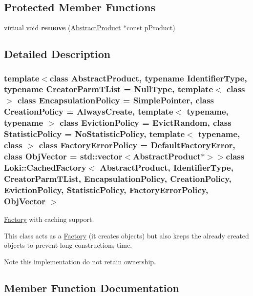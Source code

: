 \subsection*{Protected Member Functions}
\begin{DoxyCompactItemize}
\item 
\hypertarget{classLoki_1_1CachedFactory_a602f1ca3f2f2015f26386da61254ab6f}{}virtual void {\bfseries remove} (\hyperlink{classAbstractProduct}{Abstract\+Product} $\ast$const p\+Product)\label{classLoki_1_1CachedFactory_a602f1ca3f2f2015f26386da61254ab6f}

\end{DoxyCompactItemize}


\subsection{Detailed Description}
\subsubsection*{template$<$class Abstract\+Product, typename Identifier\+Type, typename Creator\+Parm\+T\+List = Null\+Type, template$<$ class $>$ class Encapsulation\+Policy = Simple\+Pointer, class Creation\+Policy = Always\+Create, template$<$ typename, typename $>$ class Eviction\+Policy = Evict\+Random, class Statistic\+Policy = No\+Statistic\+Policy, template$<$ typename, class $>$ class Factory\+Error\+Policy = Default\+Factory\+Error, class Obj\+Vector = std\+::vector$<$\+Abstract\+Product$\ast$$>$$>$class Loki\+::\+Cached\+Factory$<$ Abstract\+Product, Identifier\+Type, Creator\+Parm\+T\+List, Encapsulation\+Policy, Creation\+Policy, Eviction\+Policy, Statistic\+Policy, Factory\+Error\+Policy, Obj\+Vector $>$}

\hyperlink{classLoki_1_1Factory}{Factory} with caching support. 

This class acts as a \hyperlink{classLoki_1_1Factory}{Factory} (it creates objects) but also keeps the already created objects to prevent long constructions time.

Note this implementation do not retain ownership. 

\subsection{Member Function Documentation}
\hypertarget{classLoki_1_1CachedFactory_ac307db6556acef8179a260db4d573440}{}
